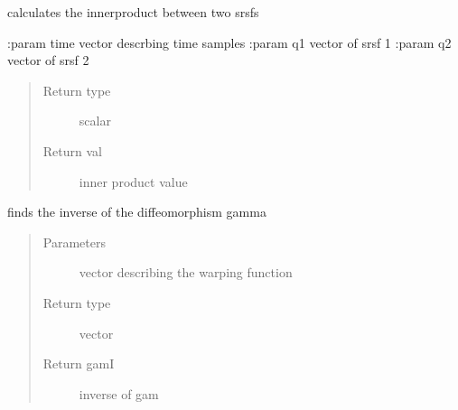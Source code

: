 \documentclass[letterpaper,10pt,english]{sphinxmanual}
\begin{document}
\begin{fulllineitems}
\label{\detokenize{utility_functions:utility_functions.innerprod_q}}
calculates the innerproduct between two srsfs

:param time vector descrbing time samples
:param q1 vector of srsf 1
:param q2 vector of srsf 2
\begin{quote}\begin{description}
\item[{Return type}] \leavevmode
scalar

\item[{Return val}] \leavevmode
inner product value

\end{description}\end{quote}

\end{fulllineitems}


\begin{fulllineitems}
\label{\detokenize{utility_functions:utility_functions.invertGamma}}
finds the inverse of the diffeomorphism gamma
\begin{quote}\begin{description}
\item[{Parameters}] \leavevmode
{} \textendash{} vector describing the warping function

\item[{Return type}] \leavevmode
vector

\item[{Return gamI}] \leavevmode
inverse of gam

\end{description}\end{quote}

\end{fulllineitems}

\end{document}
